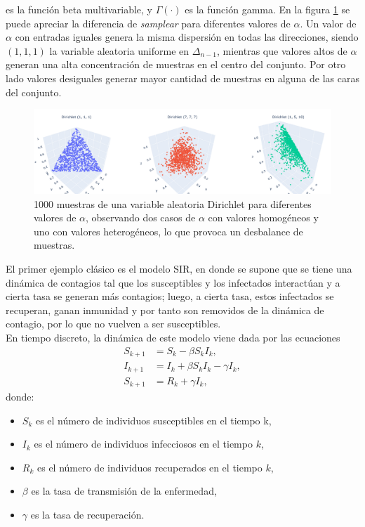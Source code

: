 es la función beta multivariable, y $\Gamma(\cdot)$ es la función gamma. En la figura \ref{fig:Dirichlet_samples} se puede apreciar la diferencia de \textit{samplear} para diferentes valores de $\alpha$. Un valor de $\alpha$ con entradas iguales genera la misma dispersión en todas las direcciones, siendo $(1, 1, 1)$ la variable aleatoria uniforme en $\Delta_{n-1}$, mientras que valores altos de $\alpha$ generan una alta concentración de muestras en el centro del conjunto. Por otro lado valores desiguales generar mayor cantidad de muestras en alguna de las caras del conjunto.
\begin{figure}[htbp]
    \centering
    \includegraphics[width=0.95\linewidth]{img/content/chapter3/Dirichlet.pdf}
    \caption{1000 muestras de una variable aleatoria Dirichlet para diferentes valores de $\alpha$, observando dos casos de $\alpha$ con valores homogéneos y uno con valores heterogéneos, lo que provoca un desbalance de muestras.}
    \label{fig:Dirichlet_samples}
\end{figure}
El primer ejemplo clásico es el modelo SIR, en donde se supone que se tiene una dinámica de contagios tal que los susceptibles y los infectados interactúan y a cierta tasa se generan más contagios; luego, a cierta tasa, estos infectados se recuperan, ganan inmunidad y por tanto son removidos de la dinámica de contagio, por lo que no vuelven a ser susceptibles.\\
En tiempo discreto, la dinámica de este modelo viene dada por las ecuaciones
\begin{equation}
    \begin{aligned}
    S_{k+1} &= S_k -\beta S_k I_k, \\
    I_{k+1} &= I_k + \beta S_k I_k - \gamma I_k, \\
    S_{k+1} &= R_k + \gamma I_k,
    \end{aligned}
    \label{eq:SIR}
\end{equation}
donde:
\begin{itemize}
    \item \(S_k\) es el número de individuos susceptibles en el tiempo k,
    \item \(I_k\) es el número de individuos infecciosos en el tiempo \(k\),
    \item \(R_k\) es el número de individuos recuperados en el tiempo \(k\),
    \item \(\beta\) es la tasa de transmisión de la enfermedad,
    \item \(\gamma\) es la tasa de recuperación.
\end{itemize}
